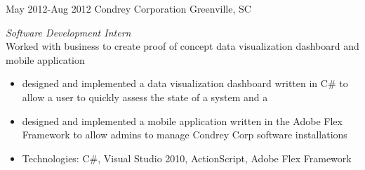 \begin{entrylist}
\entry
{May 2012-Aug 2012}
{Condrey Corporation}
{Greenville, SC}
{\emph{Software Development Intern} \\
Worked with business to create proof of concept data visualization dashboard and mobile application
\begin{itemize}
\item designed and implemented a data visualization dashboard written in C\# to allow a user to quickly assess the state of a system and a
\item designed and implemented a mobile application written in the Adobe Flex Framework to allow admins to manage Condrey Corp software installations
\item Technologies: C\#, Visual Studio 2010, ActionScript, Adobe Flex Framework
\end{itemize}}


\end{entrylist}
